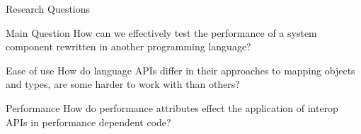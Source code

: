 
\begin{frame}{Research Questions}
    \begin{block}{Main Question}
        How can we effectively test the performance of a system component rewritten in another programming language?
    \end{block}

    \pause

    \begin{block}{Ease of use}
        How do language APIs differ in their approaches to mapping objects and types, are some harder to work with than others?
    \end{block}

    \pause

    \begin{block}{Performance}
        How do performance attributes effect the application of interop APIs in performance dependent code?
    \end{block}

\end{frame}